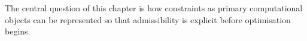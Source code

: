 The central question of this chapter is how constraints as primary computational objects can be represented so that admissibility is explicit before optimisation begins.
